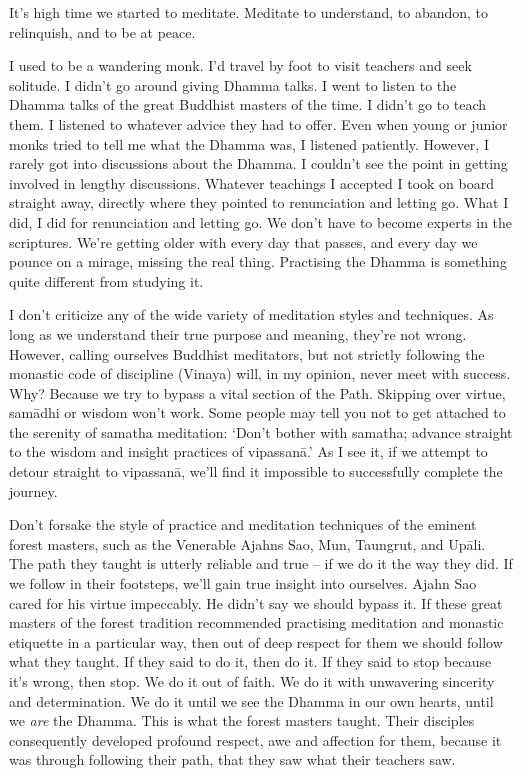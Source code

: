 It's high time we started to meditate. Meditate to understand, to abandon, to relinquish, and to be at peace.

I used to be a wandering monk. I'd travel by foot to visit teachers and seek solitude. I didn't go around giving Dhamma talks. I went to listen to the Dhamma talks of the great Buddhist masters of the time. I didn't go to teach them. I listened to whatever advice they had to offer. Even when young or junior monks tried to tell me what the Dhamma was, I listened patiently. However, I rarely got into discussions about the Dhamma. I couldn't see the point in getting involved in lengthy discussions. Whatever teachings I accepted I took on board straight away, directly where they pointed to renunciation and letting go. What I did, I did for renunciation and letting go. We don't have to become experts in the scriptures. We're getting older with every day that passes, and every day we pounce on a mirage, missing the real thing. Practising the Dhamma is something quite different from studying it.

I don't criticize any of the wide variety of meditation styles and techniques. As long as we understand their true purpose and meaning, they're not wrong. However, calling ourselves Buddhist meditators, but not strictly following the monastic code of discipline (Vinaya) will, in my opinion, never meet with success. Why? Because we try to bypass a vital section of the Path. Skipping over virtue, sam\=adhi or wisdom won't work. Some people may tell you not to get attached to the serenity of samatha meditation: `Don't bother with samatha; advance straight to the wisdom and insight practices of vipassan\=a.' As I see it, if we attempt to detour straight to vipassan\=a, we'll find it impossible to successfully complete the journey.

Don't forsake the style of practice and meditation techniques of the eminent forest masters, such as the Venerable Ajahns Sao, Mun, Taungrut, and Up\=ali. The path they taught is utterly reliable and true -- if we do it the way they did. If we follow in their footsteps, we'll gain true insight into ourselves. Ajahn Sao cared for his virtue impeccably. He didn't say we should bypass it. If these great masters of the forest tradition recommended practising meditation and monastic etiquette in a particular way, then out of deep respect for them we should follow what they taught. If they said to do it, then do it. If they said to stop because it's wrong, then stop. We do it out of faith. We do it with unwavering sincerity and determination. We do it until we see the Dhamma in our own hearts, until we \textit{are} the Dhamma. This is what the forest masters taught. Their disciples consequently developed profound respect, awe and affection for them, because it was through following their path, that they saw what their teachers saw.

